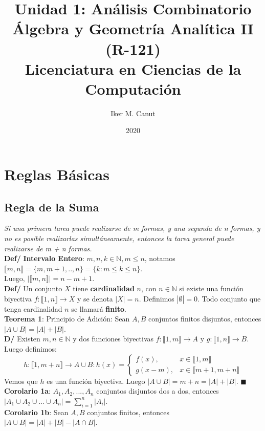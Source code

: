\documentclass[11pt,a4paper]{article}
\author{Iker M. Canut}
\title{Unidad 1: Análisis Combinatorio\\ \'Algebra y Geometr\'ia Anal\'itica II (R-121)\\Licenciatura en Ciencias de la Computaci\'on}
\date{2020}
\newcommand*{\QEDA}{\null\nobreak\hfill\ensuremath{\blacksquare}}
\begin{document}
\maketitle
\newpage

\section{Reglas B\'asicas}
\subsection{Regla de la Suma}
\noindent \textit{Si una primera tarea puede realizarse de m formas, y una segunda de n formas, y no es posible realizarlas simultáneamente, entonces la tarea general puede realizarse de m + n formas.}\\

\noindent \textbf{Def/} \textbf{Intervalo Entero}: $m,n,k \in \mathbb{N}, m \leq n$, notamos $\llbracket m,n \rrbracket = \{m,m+1,..,n\} = \{k : m \leq k \leq n\}$.\\ Luego, $|\llbracket m,n \rrbracket| = n-m+1$.\\

\noindent \textbf{Def/} Un conjunto $X$ tiene \textbf{cardinalidad} $n$, con $n \in \mathbb{N}$ si existe una funci\'on biyectiva $f : \llbracket 1,n \rrbracket \rightarrow X$ y se denota $|X| = n$. Definimos $|\emptyset| = 0$. Todo conjunto que tenga cardinalidad $n$ se llamar\'a \textbf{finito}.\\

\noindent \textbf{Teorema 1}: Principio de Adici\'on: Sean $A,B$ conjuntos finitos disjuntos, entonces $|A \cup B| = |A| + |B|$.\\ 
\textbf{D/} Existen $m,n \in \mathbb{N}$ y dos funciones biyectivas $f : \llbracket 1, m \rrbracket \rightarrow A$ y $g : \llbracket 1, n \rrbracket \rightarrow B$. Luego definimos:
\[ h : \llbracket 1, m+n \rrbracket \rightarrow A \cup B : h(x) = \left\{ \begin{array}{ll}
f(x), & x \in \llbracket 1, m \rrbracket\\
g(x-m), & x \in \llbracket m+1, m+n \rrbracket
\end{array}\right.\]
Vemos que $h$ es una funci\'on biyectiva. Luego $|A \cup B| =m + n =  |A| + |B|$. \QEDA\\

\noindent \textbf{Corolario 1a}: $A_1, A_2, ..., A_n$ conjuntos disjuntos dos a dos, entonces $|A_1 \cup A_2 \cup ... \cup A_n| = \sum_{i=1}^n |A_i|$.\\
\noindent \textbf{Corolario 1b}: Sean $A,B$ conjuntos finitos, entonces $|A \cup B| = |A| + |B| - |A \cap B|$.\\
\end{document}
